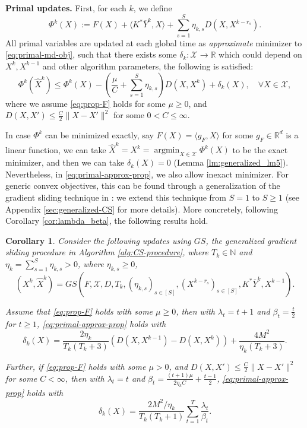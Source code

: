 \documentclass[10pt]{article}
\newcommand{\mc}{\mathcal}
\newcommand{\R}{\mathbb{R}}
\newcommand{\N}{\mathbb{N}}
\DeclareMathOperator*{\argmin}{argmin}
\newtheorem{corollary}{Corollary}[section]
\begin{document}
{\color{red}\textbf{Primal updates.}} First, for each $k$, we define 
\begin{equation}\label{eq:primal-md-obj}
    \Phi^k(X):=F(X) + \langle K^* \overline{Y}^k,X\rangle + \sum_{s=1}^S \eta_{k,s}D(X,X^{k-r_s}).
\end{equation}
All primal variables are updated at each global time as \textit{approximate} minimizer to \eqref{eq:primal-md-obj}, such that there exists some $\delta_k:\mc X\to \R$ which could depend on $X^k,X^{k-1}$ and other algorithm parameters, the following is satisfied: 
\begin{equation}\label{eq:primal-approx-prop}
    \Phi^k(\widehat{X}^k) \leq \Phi^k(X) -(\frac{\mu}{C}+\sum_{s=1}^S\eta_{k,s})D(X,X^k)+\delta_k(X),\quad \forall X\in \mc X,
\end{equation}
where we assume \eqref{eq:prop-F} holds for some $\mu\geq 0$, and $D(X,X')\leq \frac{C}{2}\|X-X'\|^2$ for some $0<C\leq \infty$. 


In case $\Phi^k$ can be minimized exactly, say $F(X) = \langle g_F,X\rangle$ for some $g_F\in \R^d$ is a linear function, we can take $\widehat{X}^k=X^k=\argmin_{X\in \mc X} \Phi^k(X)$ to be the exact minimizer, and then we can take $\delta_k(X) = 0$ (Lemma \ref{lm:generalized_lm5}). Nevertheless, in \eqref{eq:primal-approx-prop}, we also allow inexact minimizer. For generic convex objectives, this can be found through a generalization of the gradient sliding technique in \cite{lan_communication-efficient_2020}: we extend this technique from $S=1$ to $S\geq 1$ (see Appendix \ref{sec:generalized-CS} for more details). More concretely, following Corollary \ref{cor:lambda_beta}, the following results hold.
\begin{corollary}\label{cor:cs-prop-aux}
 Consider the following updates using $GS$, the generalized gradient sliding procedure in Algorithm \ref{alg:CS-procedure}, where $T_k\in \N$ and $\eta_k = \sum_{s=1}^S \eta_{k,s}>0$, where $\eta_{k,s}\geq 0$, 
\begin{equation}\label{eq:update-x-cs}
    (X^k,\widehat{X}^k) = GS(F,{\mc X},D,T_k,(\eta_{k,s})_{s\in [S]},(X^{k-r_s})_{s\in [S]},K^* \overline{Y}^k,X^{k-1}). 
\end{equation}

Assume that \eqref{eq:prop-F} holds with some $\mu\geq 0$, then with $\lambda_t = t+1$ and $\beta_t =\frac{t}{2}$ for $t\geq 1$, \eqref{eq:primal-approx-prop} holds with 
\begin{equation*}
    \delta_k(X) = \frac{2\eta_k}{T_k(T_k+3)}\left(D(X,X^{k-1})  
     - D(X,X^k) \right)+ \frac{4M^2}{\eta_k(T_k+3)}.
\end{equation*}

Further, if \eqref{eq:prop-F} holds with some $\mu> 0$, and $D(X,X')\leq \frac{C}{2}\|X-X'\|^2$ for some $C<\infty$, then with $\lambda_t = t$ and $\beta_t = \frac{(t+1)\mu}{2\eta_k C} +\frac{t-1}{2}$, \eqref{eq:primal-approx-prop} holds with 
\begin{equation*}
\delta_k(X) = \frac{2M^2/\eta_k}{T_k(T_k+1)}\sum_{t=1}^T\frac{\lambda_t}{\beta_t}.
\end{equation*}
\end{corollary}
\end{document}
